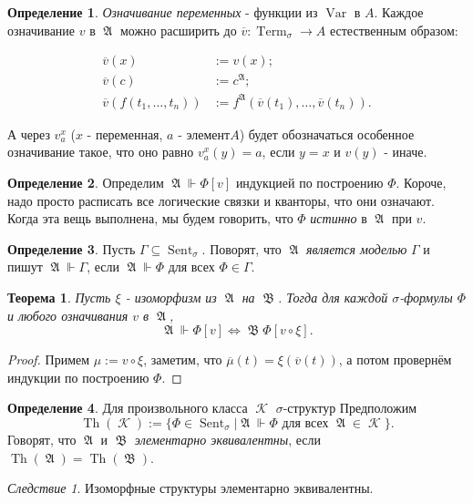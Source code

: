 \documentclass[a4paper,100pt]{article}
\theoremstyle{indented}
\newtheorem{theorem}{Теорема}
\theoremstyle{definition}
\newtheorem{defn}{Определение}
\theoremstyle{remark}
\newtheorem{cons}{Следствие}
\DeclareMathOperator{\ra}{\rightarrow}
\DeclareMathOperator{\Llra}{\Longleftrightarrow}
\DeclareMathOperator{\KK}{\mathscr{K}}
\DeclareMathOperator{\Var}{Var}
\DeclareMathOperator{\Term}{Term}
\DeclareMathOperator{\Sent}{Sent}
\DeclareMathOperator{\Th}{Th}
\DeclareMathOperator{\GA}{\mathfrak{A}}
\DeclareMathOperator{\GB}{\mathfrak{B}}
\begin{document}
\begin{defn}
  \textit{Означивание переменных} - функции из $\Var$ в $A$. Каждое означивание $v$ в $\GA$ можно расширить до $\overline{v}:\Term_\sigma \ra A$ естественным образом: 

  \begin{equation*}
    \begin{aligned}
      \overline{v}(x) & := v(x); \\ 
      \overline{v}(c) & := c^{\GA}; \\
      \overline{v}(f(t_1, \ldots, t_n)) & := f^{\GA}(\overline{v}(t_1), \ldots, \overline{v}(t_n)).
    \end{aligned}
  \end{equation*}

  А через $v^x_a$  ($x$ - переменная, $a$ - элемент$A$) будет обозначаться особенное означивание такое, что оно равно $v^x_a(y)=a$, если $y=x$ и $v(y)$ - иначе.
\end{defn}

\begin{defn}
  Определим $\GA \Vdash \Phi[v]$ индукцией по построению $\Phi$. Короче, надо просто расписать все логические связки и кванторы, что они означают. Когда эта вещь выполнена, мы будем говорить, что $\Phi$ \textit{истинно} в $\GA$ при $v$. 
\end{defn}

\begin{defn}
  Пусть $\Gamma \subseteq \Sent_\sigma$. Поворят, что $\GA$ \textit{является моделью} $\Gamma$ и пишут $\GA \Vdash \Gamma$, если $\GA \Vdash \Phi$ для всех $\Phi\in \Gamma$. 
\end{defn}

\begin{theorem}
  Пусть $\xi$ - изоморфизм из $\GA$ на $\GB$. Тогда для каждой $\sigma$-формулы $\Phi$ и любого означивания $v$ в $\GA$, 
  \[
    \GA \Vdash \Phi[v] \Llra \GB \Phi[v\circ \xi]. 
  \]
\end{theorem}

\begin{proof}
  Примем $\mu:=v\circ \xi$, заметим, что $\overline{\mu}(t) = \xi (\overline{v}(t))$, а потом провернём индукции по построению $\Phi$. 
\end{proof}

\begin{defn}
  Для произвольного класса $\KK$ $\sigma$-структур Предположим
  \[
    \Th(\KK):=\{\Phi\in \Sent_\sigma |\GA \Vdash \Phi \text{ для всех }\GA \in \KK\}.
  \]
  Говорят, что $\GA$ и $\GB$ \textit{элементарно эквивалентны}, если $\Th(\GA)=\Th(\GB)$. 
\end{defn}

\begin{cons}
  Изоморфные структуры элементарно эквивалентны.
\end{cons}
\end{document}
